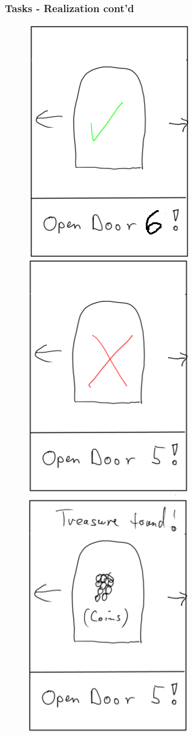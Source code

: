 \documentclass{beamer}
\begin{document}
\begin{frame}
        \frametitle{Tasks - Realization cont'd}
		
		\begin{figure}
		\includegraphics[scale=0.2]{door_opened.png}
		\hspace{1cm}
		\includegraphics[scale=0.2]{door_opened_failed.png}
		\hspace{1cm}
		\includegraphics[scale=0.2]{treasure_found.png}

\end{figure}
\end{frame}
\end{document}
